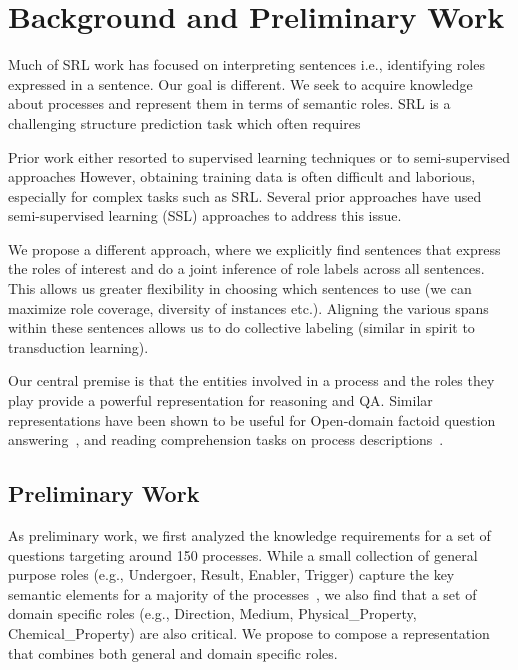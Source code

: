 
\section{Background and Preliminary Work}

Much of SRL work has focused on interpreting sentences i.e., identifying roles expressed in a sentence.
Our goal is different. 
We seek to acquire knowledge about processes and represent them in terms of semantic roles.
SRL is a challenging structure prediction task which often requires 

Prior work either resorted to supervised learning techniques or to semi-supervised approaches 
However, obtaining training data is often difficult and laborious, especially for complex tasks such as SRL.
Several prior approaches have used semi-supervised learning (SSL) approaches to address this issue. 

We propose a different approach, where we explicitly find sentences that express the roles of interest and do a joint inference of role labels across all sentences. 
This allows us greater flexibility in choosing which sentences to use (we can maximize role coverage, diversity of instances etc.).
Aligning the various spans within these sentences allows us to do collective labeling (similar in spirit to transduction learning).


Our central premise is that the entities involved in a process and the roles they play provide a powerful representation for reasoning and QA. 
Similar representations have been shown to be useful for Open-domain factoid question answering~\cite{shen2007using,pizzato2008indexing}, 
and reading comprehension tasks on process descriptions~\cite{berantSrikumar14}.


\subsection{Preliminary Work}

As preliminary work, we first analyzed the knowledge requirements for a set of questions targeting around 150 processes. 
While a small collection of general purpose roles (e.g., Undergoer, Result, Enabler, Trigger) capture the key semantic elements for a 
majority of the processes~\cite{louvan2015:kcap}, we also find that a set of domain specific roles (e.g., Direction, Medium, Physical\_Property, Chemical\_Property) are also critical. We propose to compose a representation that combines both general and domain specific roles. 

